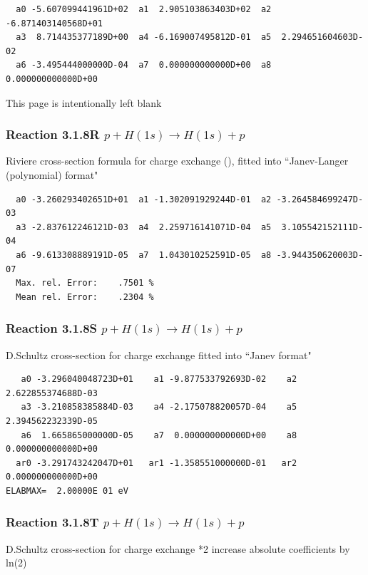 \documentclass[12pt,dvips]{article}
\begin{document}
\begin{small}\begin{verbatim}
  a0 -5.607099441961D+02  a1  2.905103863403D+02  a2 -6.871403140568D+01
  a3  8.714435377189D+00  a4 -6.169007495812D-01  a5  2.294651604603D-02
  a6 -3.495444000000D-04  a7  0.000000000000D+00  a8  0.000000000000D+00

\end{verbatim}\end{small}
\newpage
This page is intentionally left blank
\newpage

\subsubsection{
Reaction 3.1.8R $  p + H(1s) \rightarrow H(1s) + p  $
}
Riviere cross-section formula for charge exchange
(\cite{kn:Riviere}), fitted into
``Janev-Langer (polynomial) format" \cite{kn:Janev}

\begin{small}\begin{verbatim}
  a0 -3.260293402651D+01  a1 -1.302091929244D-01  a2 -3.264584699247D-03
  a3 -2.837612246121D-03  a4  2.259716141071D-04  a5  3.105542152111D-04
  a6 -9.613308889191D-05  a7  1.043010252591D-05  a8 -3.944350620003D-07
  Max. rel. Error:    .7501 %
  Mean rel. Error:    .2304 %
\end{verbatim}\end{small}

\subsubsection{
Reaction 3.1.8S $  p + H(1s) \rightarrow H(1s) + p  $
}

D.Schultz cross-section for charge exchange
fitted into ``Janev format"


\begin{small}\begin{verbatim}
   a0 -3.296040048723D+01    a1 -9.877533792693D-02    a2  2.622855374688D-03
   a3 -3.210858385884D-03    a4 -2.175078820057D-04    a5  2.394562232339D-05
   a6  1.665865000000D-05    a7  0.000000000000D+00    a8  0.000000000000D+00
  ar0 -3.291743242047D+01   ar1 -1.358551000000D-01   ar2  0.000000000000D+00
ELABMAX=  2.00000E 01 eV
\end{verbatim}\end{small}
\subsubsection{
Reaction 3.1.8T $  p + H(1s) \rightarrow H(1s) + p  $
}
D.Schultz cross-section for charge exchange *2
increase absolute coefficients by ln(2)
\end{document}
